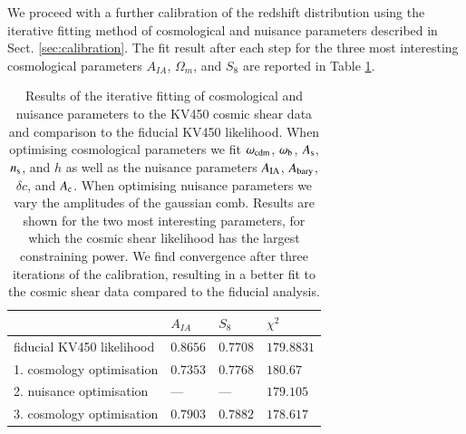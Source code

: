 \documentclass{aa}
\begin{document}
We proceed with a further calibration of the redshift distribution using the iterative fitting method of cosmological and nuisance parameters described in Sect. \ref{sec:calibration}. The fit result after each step for the three most interesting cosmological parameters $A_{IA}$, $\Omega_m$, and $S_8$ are reported in Table \ref{tab:iterative_calibration}. 
\begin{table}
\begin{tabular}{llll}
& $A_{IA}$ & $S_8$ & $\chi^2$\\
\hline
\hline
fiducial KV450 likelihood & $0.8656$  & $0.7708$ & $179.8831$\\
\hline
1. cosmology optimisation & $0.7353$  & $0.7768$ & $180.67$\\
2. nuisance optimisation & ---  & --- & $179.105$\\
3. cosmology optimisation & $0.7903$  & $0.7882$ & $178.617$\\
\end{tabular}
\caption{Results of the iterative fitting of cosmological and nuisance parameters to the KV450 cosmic shear data and comparison to the fiducial KV450 likelihood. When optimising cosmological parameters we fit $\omega_{\rm cdm}$, $\omega_{\rm b}$, $A_{\rm s}$, $n_{\rm s}$, and $h$ as well as the nuisance parameters $A_{\rm IA}$, $A_{\rm bary}$, $\delta c$, and $A_{\rm c}$. When optimising nuisance parameters we vary the amplitudes of the gaussian comb. Results are shown for the two most interesting parameters, for which the cosmic shear likelihood has the largest constraining power. We find convergence after three iterations of the calibration, resulting in a better fit to the cosmic shear data compared to the fiducial analysis.}
\label{tab:iterative_calibration}
\end{table}
\end{document}
